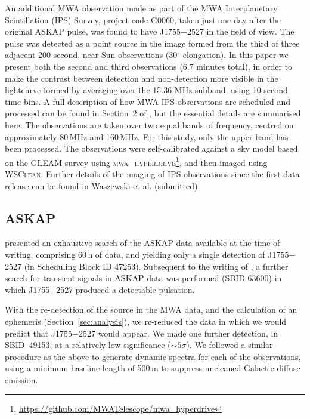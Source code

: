 \documentclass[fleqn,usenatbib]{mnras}
\newcommand{\revision}[2]{{\color{red}#2}}
\newcommand{\src}{J1755$-$2527}
\newcommand{\Sect}{Section}
\begin{document}
An additional MWA observation made as part of the MWA Interplanetary Scintillation (IPS) Survey, project code G0060, taken just one day after the original ASKAP pulse, was found to have \src{} in the field of view.
The pulse was detected as a point source in the image formed from the third of three adjacent 200-second, near-Sun observations (30$^{\circ}$ elongation).
In this paper we present both the second and third observations (6.7 minutes total), in order to make the contrast between detection and non-detection more visible in the lightcurve formed by averaging over the 15.36-MHz subband, using 10-second time bins.
A full description of how MWA IPS observations are scheduled and processed can be found in Section~2 of \citet{Morgan2022}, but the essential details are summarised here.
The observations are taken over two equal bands of frequency, centred on approximately 80\,MHz and 160\,MHz.
For this study, only the upper band has been processed. 
The observations were self-calibrated against a sky model based on the GLEAM survey \citep{Hurley-Walker2017} using \textsc{mwa\_hyperdrive}\footnote{\url{https://github.com/MWATelescope/mwa_hyperdrive}}, and then imaged using \textsc{WSClean}.
Further details of the imaging of IPS observations since the first data release can be found in Waszewski et al. (submitted).

\subsection{ASKAP} \label{sec:askap}

 presented an exhaustive search of the ASKAP data available at the time of writing, comprising 60\,h of data, and yielding only a single detection of \src{} (in Scheduling Block ID 47253). Subsequent to the writing of , a further search for transient signals in ASKAP data was performed (SBID 63600) in which \src{} produced a detectable pulsation.

With the re-detection of the source in the MWA data, and the calculation of an ephemeris (\Sect~\ref{sec:analysis}), we re-reduced the data in which we would predict that \src{} would appear. We made one further detection, in SBID~49153, at a relatively low significance ($\sim5\sigma$)\revision{ compared to the blind detections}. We followed a similar procedure as the above to generate dynamic spectra for each of the observations, using a minimum baseline length of 500\,m to suppress uncleaned Galactic diffuse emission.
\end{document}
